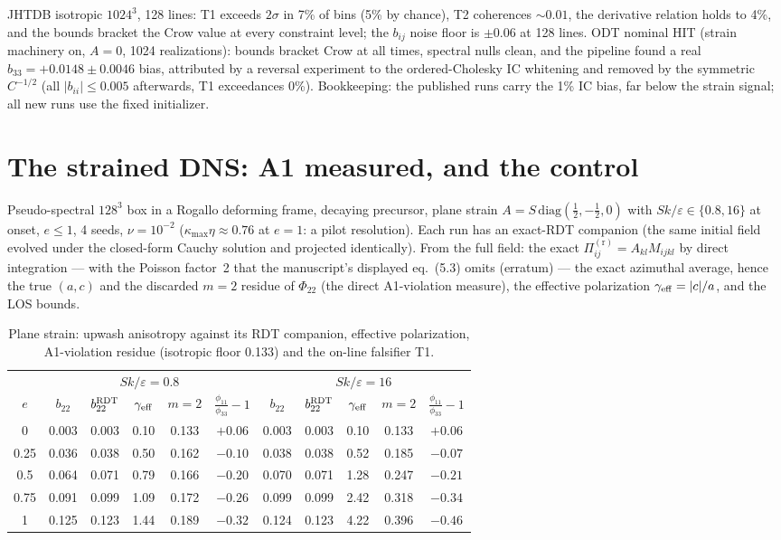 \documentclass[11pt,a4paper]{article}
\newcommand{\Pir}[1]{\Pi^{(\mathrm r)}_{#1}}
\newcommand{\Ske}{Sk/\varepsilon}
\begin{document}
JHTDB isotropic $1024^3$, 128 lines: T1 exceeds $2\sigma$ in 7\% of bins
(5\% by chance), T2 coherences $\sim0.01$, the derivative relation holds to
4\%, and the bounds bracket the Crow value at every constraint level; the
$b_{ij}$ noise floor is $\pm0.06$ at 128 lines. ODT nominal HIT (strain
machinery on, $A=0$, 1024 realizations): bounds bracket Crow at all times,
spectral nulls clean, and the pipeline found a real $b_{33}=+0.0148\pm0.0046$
bias, attributed by a reversal experiment to the ordered-Cholesky IC
whitening and removed by the symmetric $C^{-1/2}$ (all $|b_{ii}|\le0.005$
afterwards, T1 exceedances 0\%). Bookkeeping: the published runs carry the
1\% IC bias, far below the strain signal; all new runs use the fixed
initializer.

\section{The strained DNS: A1 measured, and the control}\label{sec:dns}

Pseudo-spectral $128^3$ box in a Rogallo deforming frame, decaying
precursor, plane strain $A=S\,\mathrm{diag}(\tfrac12,-\tfrac12,0)$ with
$\Ske\in\{0.8,16\}$ at onset, $e\le1$, 4 seeds, $\nu=10^{-2}$
($\kappa_{\max}\eta\approx0.76$ at $e=1$: a pilot resolution). Each run has
an exact-RDT companion (the same initial field evolved under the
closed-form Cauchy solution and projected identically). From the full
field: the exact $\Pir{ij}=A_{kl}M_{ijkl}$ by direct integration --- with
the Poisson factor~2 that the manuscript's displayed eq.\ (5.3) omits
(erratum) --- the exact azimuthal average, hence the true $(a,c)$ and the
discarded $m=2$ residue of $\Phi_{22}$ (the direct A1-violation measure),
the effective polarization $\gamma_{\rm eff}=|c|/a$, and the LOS bounds.

\begin{table}[h!]\centering\small
\begin{tabular}{c|ccccc|ccccc}
\toprule
& \multicolumn{5}{c|}{$\Ske=0.8$} & \multicolumn{5}{c}{$\Ske=16$}\\
$e$ & $b_{22}$ & $b_{22}^{\rm RDT}$ & $\gamma_{\rm eff}$ & $m{=}2$ & $\tfrac{\phi_{11}}{\phi_{33}}{-}1$
    & $b_{22}$ & $b_{22}^{\rm RDT}$ & $\gamma_{\rm eff}$ & $m{=}2$ & $\tfrac{\phi_{11}}{\phi_{33}}{-}1$\\
\midrule
0    & 0.003 & 0.003 & 0.10 & 0.133 & $+0.06$ & 0.003 & 0.003 & 0.10 & 0.133 & $+0.06$\\
0.25 & 0.036 & 0.038 & 0.50 & 0.162 & $-0.10$ & 0.038 & 0.038 & 0.52 & 0.185 & $-0.07$\\
0.5  & 0.064 & 0.071 & 0.79 & 0.166 & $-0.20$ & 0.070 & 0.071 & 1.28 & 0.247 & $-0.21$\\
0.75 & 0.091 & 0.099 & 1.09 & 0.172 & $-0.26$ & 0.099 & 0.099 & 2.42 & 0.318 & $-0.34$\\
1    & 0.125 & 0.123 & 1.44 & 0.189 & $-0.32$ & 0.124 & 0.123 & 4.22 & 0.396 & $-0.46$\\
\bottomrule
\end{tabular}
\caption{Plane strain: upwash anisotropy against its RDT companion,
effective polarization, A1-violation residue (isotropic floor 0.133) and
the on-line falsifier T1.}
\label{tab:dns}
\end{table}
\end{document}
